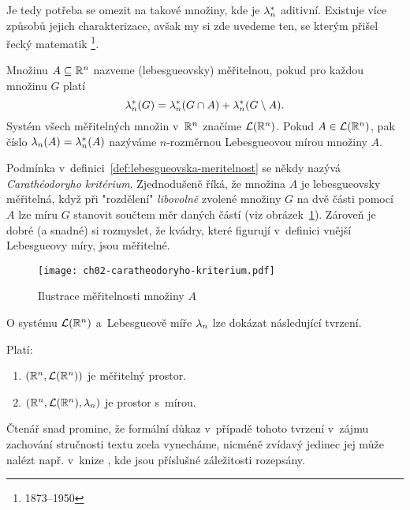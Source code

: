 Je tedy potřeba se omezit na takové množiny, kde je $\lambda_n^*$ aditivní. Existuje více způsobů jejich charakterizace, avšak my si zde uvedeme ten, se kterým přišel řecký matematik \footnote{1873--1950}.
\begin{definition}\label{def:lebesgueovska-meritelnost}
    Množinu $A\subseteq\mathbb{R}^n$ nazveme (lebesgueovsky) měřitelnou, pokud pro každou množinu $G$ platí
    \[\lambda_n^*(G)=\lambda_n^*(G\cap A)+\lambda_n^*(G\setminus A).\]
    Systém všech měřitelných množin v~$\mathbb{R}^n$ značíme $\mathcal{L}(\mathbb{R}^n)$.  Pokud $A\in\mathcal{L}(\mathbb{R}^n)$, pak číslo $\lambda_n(A)=\lambda_n^*(A)$ nazýváme $n$-rozměrnou Lebesgueovou mírou množiny $A$.
\end{definition}
Podmínka v~definici~\ref{def:lebesgueovska-meritelnost} se někdy nazývá \emph{Carathéodoryho kritérium}. Zjednodušeně říká, že množina $A$ je lebesgueovsky měřitelná, když při "rozdělení" \emph{libovolně} zvolené množiny $G$ na dvě části pomocí $A$ lze míru $G$ stanovit součtem měr daných částí (viz obrázek~\ref{fig:caratheodoryho-kriterium}). Zároveň je dobré (a snadné) si rozmyslet, že kvádry, které figurují v~definici vnější Lebesgueovy míry, jsou měřitelné.
\begin{figure}[h]
    \centering
    \texttt{[image: ch02-caratheodoryho-kriterium.pdf]}
    \caption{Ilustrace měřitelnosti množiny $A$}
    \label{fig:caratheodoryho-kriterium}
\end{figure}
O systému $\mathcal{L}(\mathbb{R}^n)$ a~Lebesgueově míře $\lambda_n$ lze dokázat následující tvrzení.
\begin{theorem}\label{thm:prostor-s-Lebesgueovou-mirou}
    Platí:
    \begin{enumerate}[label=(\roman*)]
        \item $(\mathbb{R}^n,\mathcal{L}(\mathbb{R}^n))$ je měřitelný prostor.
        \item $(\mathbb{R}^n,\mathcal{L}(\mathbb{R}^n),\lambda_n)$ je prostor s~mírou.
    \end{enumerate}
\end{theorem}
Čtenář snad promine, že formální důkaz v~případě tohoto tvrzení v~zájmu zachování stručnosti textu zcela vynecháme, nicméně zvídavý jedinec jej může nalézt např. v~knize \citep[str. 347]{Royden2010}, kde jsou příslušné záležitosti rozepsány.